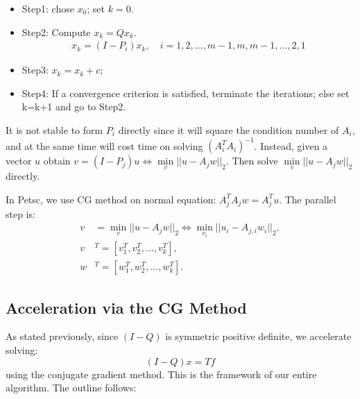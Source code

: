 \documentclass[a4paper,12pt]{article}
\begin{document}
  \begin{itemize}
      \item Step1: chose $x_{0}$; set $k=0$.
      \item Step2: Compute $x_{k}=Qx_{k}$.
            \begin{equation*}
                \begin{split}
                    x_{k}=(I-P_{i})x_{k}, \quad i=1,2,...,m-1,m,m-1,...,2,1
                \end{split}
            \end{equation*}
      \item Step3: $x_{k}=x_{k}+c;$
      \item Step4: If a convergence criterion is satisfied, terminate the iterations; else set k=k+1 and go to Step2.
  \end{itemize}

It is not stable to form $P_{i}$ directly since it will square the condition number of $A_{i}$, and at the same time will cost time on solving $(A^{T}_{i}A_{i})^{-1}$. Instead, given a vector $u$ obtain $v=(I-P_{j})u \Leftrightarrow \min\limits_{v}||u-A_{j}w||_{2}$. Then solve $\min\limits_{v}||u-A_{j}w||_{2}$ directly. 

In Petsc, we use CG method on normal equation: $A_{j}^{T}A_{j}w=A_{j}^{T}u$. The parallel step is:
        \begin{equation*}
            \begin{split}
                v&=\min\limits_{v}||u-A_{j}w||_{2}\Leftrightarrow \min\limits_{v_{i}}||u_{i}-A_{j,i}w_{i}||_{2},\\
                v&^{T}=[v_{1}^{T},v_{2}^{T},...,v_{k}^{T}],\\
                w&^{T}=[w_{1}^{T},w_{2}^{T},...,w_{k}^{T}].
            \end{split}
        \end{equation*}

 

 \subsection{Acceleration via the CG Method}
As stated previously, since $(I-Q)$ is symmetric positive definite, we accelerate solving: $$(I-Q)x = Tf$$  using the conjugate gradient method. This is the framework of our entire algorithm. The outline follows:
\end{document}
